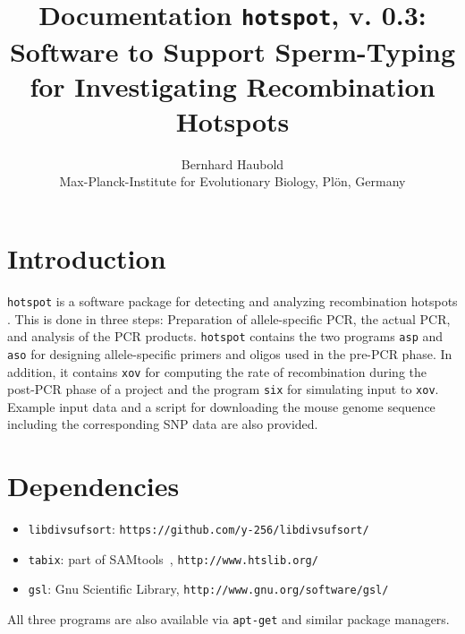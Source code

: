 \documentclass{article}
\newcommand{\bi}{\begin{itemize}}
\newcommand{\ei}{\end{itemize}}
\newcommand{\I}{\item}
\newcommand{\ty}{\texttt}
\newcommand{\version}{0.3}
\begin{document}
\title{Documentation \ty{hotspot}, v. \version: Software to Support Sperm-Typing for
Investigating Recombination Hotspots}
\author{Bernhard Haubold\\\small Max-Planck-Institute for Evolutionary Biology, Pl\"on, Germany}
\maketitle
\section{Introduction}
\ty{hotspot} is a software package for detecting and analyzing
recombination hotspots \cite{ode15:hot}. This is done in three steps:
Preparation of allele-specific PCR, the actual PCR, and analysis of
the PCR products. \ty{hotspot} contains the two programs \ty{asp} and \ty{aso} for designing
allele-specific primers and oligos used in the pre-PCR phase. In
addition, it contains \ty{xov} for computing the rate of recombination
during the post-PCR phase of a project and the program \ty{six} for simulating input to \ty{xov}. Example input data and a script for downloading the mouse
genome sequence including the corresponding SNP data are also provided.

\section{Dependencies}
\bi
\I \ty{libdivsufsort}: \ty{https://github.com/y-256/libdivsufsort/}
\I \ty{tabix}: part of SAMtools~\cite{li09:seq},
\ty{http://www.htslib.org/}
\I \ty{gsl}: Gnu Scientific Library, \ty{http://www.gnu.org/software/gsl/}
\ei
All three programs are also available via \ty{apt-get} and similar
package managers.
\end{document}
